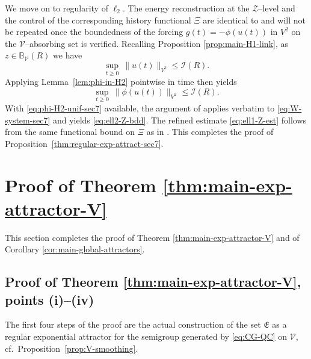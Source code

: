 \documentclass[12pt,leqno]{amsart}
\theoremstyle{definition}
\numberwithin{equation}{section}
\numberwithin{figure}{section}
\begin{document}
   We move on to regularity of $\ell_2$.
The energy reconstruction at the $\mathcal Z$--level and the control of the corresponding  history functional $\Xi$
are identical to \cite[Step~2 of Lemma~7.3 together with Lemma~7.4]{CGDP2010} and will not be repeated  once  the boundedness of the forcing
$g(t)=-\phi(u(t))$ in ${V^2}$ on the $\mathcal V$--absorbing set is verified.
Recalling Proposition \ref{prop:main-H1-link}, as $z\in\mathbb B_{\mathcal V}(R)$  we have
\begin{equation}\label{eq:u-H2-unif-sec7}
\sup_{t\ge0}\ \|u(t)\|_{{V^2}}\le \mathcal I(R).
\end{equation}
Applying Lemma~\ref{lem:phi-in-H2} pointwise in time then  yields
\begin{equation}\label{eq:phi-H2-unif-sec7}
\sup_{t\ge0}\ \|\phi(u(t))\|_{{V^2}}\le \mathcal I(R).
\end{equation}
With \eqref{eq:phi-H2-unif-sec7} available, the argument of \cite[Lemma~7.3]{CGDP2010} applies verbatim to
\eqref{eq:W-system-sec7} and yields \eqref{eq:ell2-Z-bdd}. The refined estimate \eqref{eq:ell1-Z-est}
follows from the same functional bound on $\Xi$ as in \cite[Lemma~7.4]{CGDP2010}.
This completes the proof of Proposition~\ref{thm:regular-exp-attract-sec7}. 


\section{Proof of Theorem \ref{thm:main-exp-attractor-V}}\label{sec:exp-attractor-V}
This section completes the proof of Theorem \ref{thm:main-exp-attractor-V} and of Corollary \ref{cor:main-global-attractors}. 

\subsection{Proof of Theorem \ref{thm:main-exp-attractor-V}, points (i)--(iv)}
 The first four steps of the proof are the actual construction of the set $\mathfrak E$ as a regular exponential attractor for the semigroup generated by \eqref{eq:CG-QC} on $\mathcal V$, cf.\ Proposition~\ref{prop:V-smoothing}.
\end{document}
